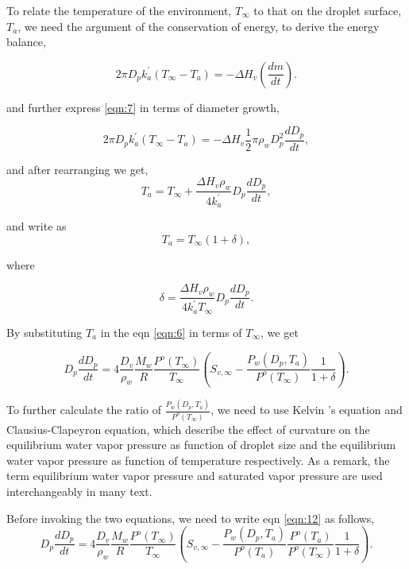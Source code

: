 \documentclass[12pt]{amsart}
\begin{document}
To relate the temperature of the environment, $T_{\infty}$ to that on the droplet surface, $T_{a}$, we need the argument of the conservation of energy, to derive the energy balance,

\begin{equation}\label{eqn:7}
2 \pi D_{p} k^{'}_{a} (T_{\infty}-T_{a})= -\Delta H_{v}(\frac{dm}{dt}).
\end{equation}

and further express \ref{eqn:7} in terms of diameter growth, 

\begin{equation}
2 \pi D_{p} k^{'}_{a} (T_{\infty}-T_{a})= -\Delta H_{v} \frac{1}{2} \pi \rho_{w} D_{p}^{2} \frac{dD_{p}}{dt},
\end{equation}

and after rearranging we get, 
\begin{equation}
T_{a}= T_{\infty} + \frac{\Delta H_{v}  \rho_{w}}{4 k^{'}_{a}} D_{p} \frac{dD_{p}}{dt},
\end{equation}

and write as 
\begin{equation}
T_{a}=T_{\infty}(1+\delta),
\end{equation}

where 

\begin{equation}\label{eqn:SPdelta}
\delta= \frac{\Delta H_{v}  \rho_{w}}{4 k^{'}_{a}T_{\infty}} D_{p} \frac{dD_{p}}{dt}.
\end{equation}

By substituting $T_{a}$ in the eqn \ref{eqn:6} in terms of $T_{\infty}$, we get 


\begin{equation}\label{eqn:12}
D_{p}\frac{dD_{p}}{dt}=4 \frac{D_{v}} {\rho_{w}} \frac{M_{w}}{R} \frac{P^{o}(T_{\infty})} {T_{\infty}} (S_{v, \infty} - \frac{P_{w}(D_{p}, T_{a})}{P^{o}(T_{\infty})} \frac{1}{1+\delta}).
\end{equation}

To further calculate the ratio of $\frac{P_{w}(D_{p}, T_{a})}{P^{o}(T_{\infty})}$, we need to use Kelvin 's equation and Clausius-Clapeyron equation, which describe the effect of curvature on the equilibrium water vapor pressure as function of droplet size and the equilibrium water vapor pressure as function of temperature respectively. As a remark, the term equilibrium water vapor pressure and saturated vapor pressure are used interchangeably in many text.

Before invoking the two equations, we need to write eqn \ref{eqn:12} as follows,
\begin{equation}\label{eqn:SPgrowth}
D_{p}\frac{dD_{p}}{dt}=4 \frac{D_{v}} {\rho_{w}} \frac{M_{w}}{R} \frac{P^{o}(T_{\infty})} {T_{\infty}} (S_{v, \infty} - \frac{P_{w}(D_{p}, T_{a})}{P^{o}(T_{a})} \frac{P^{o}(T_{a})}{P^{o}(T_{\infty})}\frac{1}{1+\delta}).
\end{equation}
\end{document}
